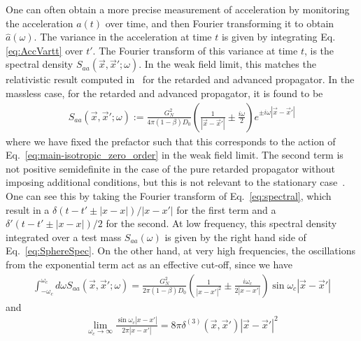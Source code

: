 \documentclass[aps,pra,amsmath,amssymb,amsthm,floatfix,nofootinbib,notitlepage,superscriptaddress,10pt]{revtex4-2}
\begin{document}
One can often obtain a more precise measurement of acceleration by monitoring the acceleration $a(t)$ over time, and then Fourier transforming it to obtain  $\hat{a}(\omega)$. The variance in the acceleration at time $t$ is given by integrating Eq. \eqref{eq:AccVartt} over $t'$. The Fourier transform of this variance at time $t$,  is the spectral density $S_{aa}(\vec{x},\vec{x}';\omega)$. In the weak field limit, this matches the relativistic result computed in~\cite{grudka2023renormalisable} for the retarded and advanced propagator. In the massless case, for the retarded and advanced propagator, it is found to be
\begin{align}
	S_{aa}(\vec{x},\vec{x}';\omega):=\frac{G_N^2}{ 4\pi (1-\beta)D_0}\left(\frac{1}{|\vec{x}-\vec{x}'|}\pm \frac{i \omega }{2}\right) e^{\pm i \omega |\vec{x}-\vec{x}'|}
	\label{eq:spectral}
\end{align}
where we have fixed the prefactor such that this corresponds to the action of Eq.~\eqref{eq:main-isotropic_zero_order} in the weak field limit. The second term is not positive semidefinite in the case of the pure retarded propagator without imposing additional conditions, but this is not relevant to the stationary case~\cite{grudka2023renormalisable}. One can see this by taking the Fourier transform of Eq.~\eqref{eq:spectral}, which result in a $\delta(t-t'\pm |x-x|)/|x-x'|$ for the first term and a 
$\delta'(t-t'\pm |x-x|)/2$ for the second.
At low frequency, this spectral density integrated over a test mass $S_{aa}(\omega)$ is given by the right hand side of Eq.~\eqref{eq:SphereSpec}. On the other hand, at very high frequencies, the oscillations from the exponential term act as an effective cut-off, since we have
\begin{align}
	\int_{-\omega_c}^{\omega_c}d\omega S_{aa}(\vec{x},\vec{x}';\omega)=\frac{G_N^2}{ 2\pi (1-\beta)D_0}\left( \frac{1}{|x-x'|^2} \pm \frac{i \omega_c }{2|x-x'|} \right) \sin { \omega_c |\vec{x}-\vec{x}'|}
\end{align}
and
\begin{align}
	\lim\limits_{\omega_c\rightarrow\infty}\frac{\sin{\omega_c |x-x'|}}{2\pi |x-x'|}=8\pi \delta^{(3)}(\vec{x},\vec{x}')|\vec{x}-\vec{x}'|^2
\end{align}
\end{document}
